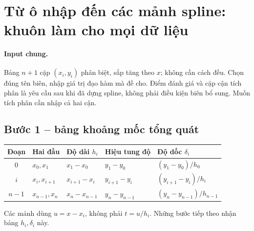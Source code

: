 \section{Từ ô nhập đến các mảnh spline: khuôn làm cho mọi dữ liệu}

\paragraph{Input chung.} Bảng $n+1$ cặp $(x_i,y_i)$ phân biệt, sắp tăng theo $x$; không cần cách đều. Chọn đúng tên biên, nhập giá trị đạo hàm mà đề cho. Điểm đánh giá và cặp cận tích phân là yêu cầu sau khi đã dựng spline, không phải điều kiện biên bổ sung. Muốn tích phân cần nhập cả hai cận.

\subsection{Bước 1 -- bảng khoảng mốc tổng quát}
\begin{center}\small\begin{tabular}{cllll}\toprule
Đoạn&Hai đầu&Độ dài $h_i$&Hiệu tung độ&Độ dốc $\delta_i$\\\midrule
0&$x_0,x_1$&$x_1-x_0$&$y_1-y_0$&$(y_1-y_0)/h_0$\\
$i$&$x_i,x_{i+1}$&$x_{i+1}-x_i$&$y_{i+1}-y_i$&$(y_{i+1}-y_i)/h_i$\\
$n-1$&$x_{n-1},x_n$&$x_n-x_{n-1}$&$y_n-y_{n-1}$&$(y_n-y_{n-1})/h_{n-1}$\\\bottomrule
\end{tabular}\end{center}
Các mảnh dùng $u=x-x_i$, không phải $t=u/h_i$. Những bước tiếp theo nhận bảng $h_i,\delta_i$ này.

